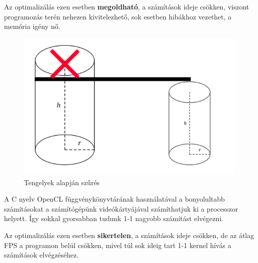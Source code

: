 Az optimalizálás ezen esetben \textbf{megoldható}, a számítások ideje csökken, viszont programozás terén nehezen kivitelezhető, sok esetben hibákhoz vezethet, a memória igény nő.
\begin{figure}[h]
	\centering
	\includegraphics[width=13truecm, height=7.5truecm]{images/opt_5.3.png}
	\caption{Tengelyek alapján szűrés}
	\label{fig:opt_3}
\end{figure}



A C nyelv OpenCL függvénykönyvtárának használatával a bonyolultabb számításokat a számítógépünk videókártyájával számíthatjuk ki a processzor helyett. Így sokkal gyorsabban tudunk 1-1 nagyobb számítást elvégezni.

Az optimalizálás ezen esetben \textbf{sikertelen}, a számítások ideje csökken, de az átlag FPS a programon belül csökken, mivel túl sok ideig tart 1-1 kernel hívás a számítások elvégzéséhez.